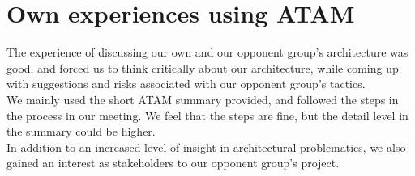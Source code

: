 \section{Own experiences using ATAM}

The experience of discussing our own and our opponent group's architecture was good, and forced us to think critically about our architecture, while coming up with suggestions and risks associated with our opponent group's tactics. \\

We mainly used the short ATAM summary provided, and followed the steps in the process in our meeting. We feel that the steps are fine, but the detail level in the summary could be higher. \\

In addition to an increased level of insight in architectural problematics, we also gained an interest as stakeholders to our opponent group's project.





